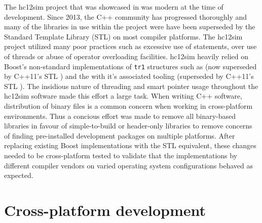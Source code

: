 The hc12sim project that was showcased in \cite{Brightwell2013} was modern at the time of development. Since 2013, the C++ community has progressed thoroughly and many of the libraries in use within the project were have been superseded by the Standard Template Library (STL) on most compiler platforms. The hc12sim project utilized many poor practices such as excessive use of  statements, over use of threads or abuse of operator overloading facilities. hc12sim heavily relied on Boost's non-standard implementations of \verb|tr1| structures such as  \cite{Boost1.53.0:SmartPointers} (now superseded by C++11's STL  \cite{cppreference:shared-ptr}) and the  with it's associated tooling \cite{Boost1.53.0:Thread} (superseded by C++11's STL  \cite{cppreference:thread}). The insidious nature of threading and smart pointer usage throughout the hc12sim software made this effort a large task. When writing C++ software, distribution of binary files is a common concern when working in cross-platform environments. Thus a concious effort was made to remove all binary-based libraries in favour of simple-to-build or header-only libraries to remove concerns of finding pre-installed development packages on multiple platforms. After replacing existing Boost implementations with the STL equivalent, these changes needed to be cross-platform tested to validate that the implementations by different compiler vendors on varied operating system configurations behaved as expected.


\section{Cross-platform development}
\label{sec:cross-platform:sec:cross-platform-development}


